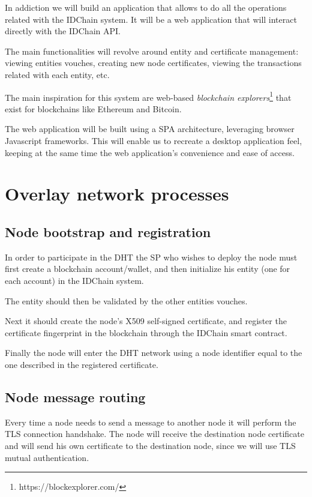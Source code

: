 {In addiction we will build an application that allows to do all the operations related with the IDChain system.
It will be a web application that will interact directly with the IDChain API.

The main functionalities will revolve around entity and certificate management: viewing entities vouches, creating new node certificates, viewing the transactions related with each entity, etc.

The main inspiration for this system are web-based \textit{blockchain explorers}\footnote{https://blockexplorer.com/} that exist for blockchains like Ethereum and Bitcoin.

The web application will be built using a \ac{SPA} architecture, leveraging browser Javascript frameworks.
This will enable us to recreate a desktop application feel, keeping at the same time the web application's convenience and ease of access.

\section{Overlay network processes}

\subsection{Node bootstrap and registration}
In order to participate in the DHT the \ac{SP} who wishes to deploy the node must first create a blockchain account/wallet, and then initialize his entity (one for each account) in the IDChain system.

The entity should then be validated by the other entities vouches.

Next it should create the node's X509 self-signed certificate, and register the certificate fingerprint in the blockchain through the IDChain smart contract.

Finally the node will enter the DHT network using a node identifier equal to the one described in the registered certificate.



\subsection{Node message routing}
Every time a node needs to send a message to another node it will perform the TLS connection handshake.
The node will receive the destination node certificate and will send his own certificate to the destination node, since we will use TLS mutual authentication.

}
